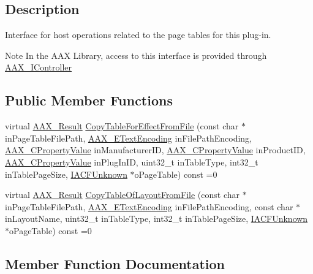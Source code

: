 \subsection{Description}
Interface for host operations related to the page tables for this plug-\/in. 

\begin{DoxyNote}{Note}
In the A\+A\+X Library, access to this interface is provided through \hyperlink{a00090}{A\+A\+X\+\_\+\+I\+Controller} 
\end{DoxyNote}
\subsection*{Public Member Functions}
\begin{DoxyCompactItemize}
\item 
virtual \hyperlink{a00149_a4d8f69a697df7f70c3a8e9b8ee130d2f}{A\+A\+X\+\_\+\+Result} \hyperlink{a00077_a6f5d2f9109b365c62c569b3dc344565f}{Copy\+Table\+For\+Effect\+From\+File} (const char $\ast$in\+Page\+Table\+File\+Path, \hyperlink{a00206_a8152e57310850693e4e7f00fc4922d74}{A\+A\+X\+\_\+\+E\+Text\+Encoding} in\+File\+Path\+Encoding, \hyperlink{a00149_ab247c0d8686c14e05cbb567ef276f249}{A\+A\+X\+\_\+\+C\+Property\+Value} in\+Manufacturer\+I\+D, \hyperlink{a00149_ab247c0d8686c14e05cbb567ef276f249}{A\+A\+X\+\_\+\+C\+Property\+Value} in\+Product\+I\+D, \hyperlink{a00149_ab247c0d8686c14e05cbb567ef276f249}{A\+A\+X\+\_\+\+C\+Property\+Value} in\+Plug\+In\+I\+D, uint32\+\_\+t in\+Table\+Type, int32\+\_\+t in\+Table\+Page\+Size, \hyperlink{a00146}{I\+A\+C\+F\+Unknown} $\ast$o\+Page\+Table) const =0
\item 
virtual \hyperlink{a00149_a4d8f69a697df7f70c3a8e9b8ee130d2f}{A\+A\+X\+\_\+\+Result} \hyperlink{a00077_a80c711274a466f9a0333ac0c322763db}{Copy\+Table\+Of\+Layout\+From\+File} (const char $\ast$in\+Page\+Table\+File\+Path, \hyperlink{a00206_a8152e57310850693e4e7f00fc4922d74}{A\+A\+X\+\_\+\+E\+Text\+Encoding} in\+File\+Path\+Encoding, const char $\ast$in\+Layout\+Name, uint32\+\_\+t in\+Table\+Type, int32\+\_\+t in\+Table\+Page\+Size, \hyperlink{a00146}{I\+A\+C\+F\+Unknown} $\ast$o\+Page\+Table) const =0
\end{DoxyCompactItemize}


\subsection{Member Function Documentation}
\hypertarget{a00077_a6f5d2f9109b365c62c569b3dc344565f}{}
